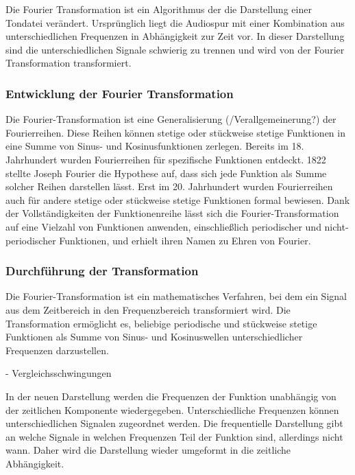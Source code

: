 Die Fourier Transformation ist ein Algorithmus der die Darstellung einer Tondatei verändert. Ursprünglich liegt die Audiospur mit einer Kombination aus unterschiedlichen Frequenzen in Abhängigkeit zur Zeit vor. In dieser Darstellung sind die unterschiedlichen Signale schwierig zu trennen und wird von der Fourier Transformation transformiert.

\par

%
\subsubsection{Entwicklung der Fourier Transformation}
%

Die Fourier-Transformation ist eine Generalisierung (/Verallgemeinerung?) der Fourierreihen. Diese Reihen können stetige oder stückweise stetige Funktionen in eine Summe von Sinus- und Kosinusfunktionen zerlegen. Bereits im 18. Jahrhundert wurden Fourierreihen für spezifische Funktionen entdeckt. 1822 stellte Joseph Fourier die Hypothese auf, dass sich jede Funktion als Summe solcher Reihen darstellen lässt. Erst im 20. Jahrhundert wurden Fourierreihen auch für andere stetige oder stückweise stetige Funktionen formal bewiesen. Dank der Vollständigkeiten der Funktionenreihe lässt sich die Fourier-Transformation auf eine Vielzahl von Funktionen anwenden, einschließlich periodischer und nicht-periodischer Funktionen, und erhielt ihren Namen zu Ehren von Fourier.

\par

\subsubsection{Durchführung der Transformation}

Die Fourier-Transformation ist ein mathematisches Verfahren, bei dem ein Signal aus dem Zeitbereich in den Frequenzbereich transformiert wird. Die Transformation ermöglicht es, beliebige periodische und stückweise stetige Funktionen als Summe von Sinus- und Kosinuswellen unterschiedlicher Frequenzen darzustellen.

\par

 - Vergleichsschwingungen
 
\par

In der neuen Darstellung werden die Frequenzen der Funktion unabhängig von der zeitlichen Komponente wiedergegeben. Unterschiedliche Frequenzen können unterschiedlichen Signalen zugeordnet werden. Die frequentielle Darstellung gibt an welche Signale in welchen Frequenzen Teil der Funktion sind, allerdings nicht wann. Daher wird die Darstellung wieder umgeformt in die zeitliche Abhängigkeit. 

